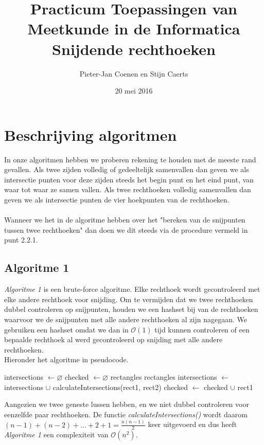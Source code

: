 \documentclass[11pt,a4paper,titlepage]{article}
\author{Pieter-Jan Coenen en Stijn Caerts}
\title{Practicum Toepassingen van Meetkunde in de Informatica \\ Snijdende rechthoeken}
\date{20 mei 2016}
\begin{document}
	\maketitle
	\tableofcontents
	\newpage
	\section{Beschrijving algoritmen}
	In onze algoritmen hebben we proberen rekening te houden met de meeste rand gevallen. Als twee zijden volledig of gedeeltelijk samenvallen dan geven we als intersectie punten voor deze zijden steeds het begin punt en het eind punt, van waar tot waar ze samen vallen.  Als twee rechthoeken volledig samenvallen dan geven we als intersectie punten de vier hoekpunten van de rechthoeken.\\ \\
	Wanneer we het in de algoritme hebben over het "bereken van de snijpunten tussen twee rechthoeken" dan doen we dit steeds via de procedure vermeld in punt 2.2.1.
	\subsection{Algoritme 1}
	\emph{Algoritme 1} is een brute-force algoritme. Elke rechthoek wordt gecontroleerd met elke andere rechthoek voor snijding. Om te vermijden dat we twee rechthoeken dubbel controleren op snijpunten, houden we een hashset bij van de rechthoeken waarvoor we de snijpunten met alle andere rechthoeken al zijn nagegaan. We gebruiken een hashset omdat we dan in  $\mathcal{O}(1)$ tijd kunnen controleren of een bepaalde rechthoek al werd gecontroleerd op snijding met alle andere rechthoeken.\\ Hieronder het algoritme in pseudocode.
	\begin{algorithm}[H]
		\caption{}
		\begin{algorithmic}[1]
			\State intersections $\gets \varnothing $
			\State checked $\gets \varnothing $
			 {rectangles}
				 {rectangles}
						\State intersections $ \gets $ intersections $ \cup $ calculateIntersections(rect1, rect2)
					\EndIf
				\EndForEach
				\State checked $\gets$ checked $\cup$ rect1
			\EndForEach
		\end{algorithmic}
	\end{algorithm}
	Aangezien we twee geneste lussen hebben, en we niet dubbel controleren voor eenzelfde paar rechthoeken. De functie \emph{calculateIntersections()} wordt daarom $ (n-1) + (n-2) + \dots + 2 + 1 = \frac{n(n-1)}{2} $ keer uitgevoerd en dus heeft \emph{Algoritme 1} een complexiteit van $\mathcal{O}(n^2)$.
	
\end{document}
